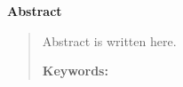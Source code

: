 \thispagestyle{empty} 

\begin{latin}
\centerline{\textbf{\large{Abstract}}}
\begin{quote}
Abstract is written here.

\vskip 1cm 
\textbf{Keywords:}\textit{ } 
  
\end{quote}
\end{latin}

